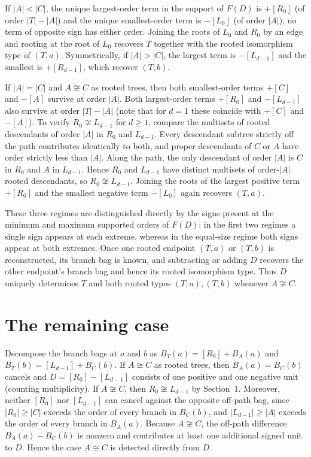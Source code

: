\documentclass[10pt]{article}
\begin{document}
If $|A|<|C|$, the unique largest-order term in the support of $F(D)$ is $+[R_0]$ (of order $|T|-|A|$) and the unique smallest-order term is $-[L_0]$ (of order $|A|$); no term of opposite sign has either order. Joining the roots of $L_0$ and $R_0$ by an edge and rooting at the root of $L_0$ recovers $T$ together with the rooted isomorphism type of $(T,a)$. Symmetrically, if $|A|>|C|$, the largest term is $-[L_{d-1}]$ and the smallest is $+[R_{d-1}]$, which recover $(T,b)$.

If $|A|=|C|$ and $A\not\cong C$ as rooted trees, then both smallest-order terms $+[C]$ and $-[A]$ survive at order $|A|$. Both largest-order terms $+[R_0]$ and $-[L_{d-1}]$ also survive at order $|T|-|A|$ (note that for $d=1$ these coincide with $+[C]$ and $-[A]$). To verify $R_0\not\cong L_{d-1}$ for $d\ge 1$, compare the multisets of rooted descendants of order $|A|$ in $R_0$ and $L_{d-1}$. Every descendant subtree strictly off the path contributes identically to both, and proper descendants of $C$ or $A$ have order strictly less than $|A|$. Along the path, the only descendant of order $|A|$ is $C$ in $R_0$ and $A$ in $L_{d-1}$. Hence $R_0$ and $L_{d-1}$ have distinct multisets of order-$|A|$ rooted descendants, so $R_0\not\cong L_{d-1}$. Joining the roots of the largest positive term $+[R_0]$ and the smallest negative term $-[L_0]$ again recovers $(T,a)$.

These three regimes are distinguished directly by the signs present at the minimum and maximum supported orders of $F(D)$: in the first two regimes a single sign appears at each extreme, whereas in the equal-size regime both signs appear at both extremes. Once one rooted endpoint $(T,a)$ or $(T,b)$ is reconstructed, its branch bag is known, and subtracting or adding $D$ recovers the other endpoint's branch bag and hence its rooted isomorphism type. Thus $D$ uniquely determines $T$ and both rooted types $(T,a),(T,b)$ whenever $A\not\cong C$.

\section{The remaining case}

Decompose the branch bags at $a$ and $b$ as $B_T(a) = [R_0] + B_A(a)$ and $B_T(b) = [L_{d-1}] + B_C(b)$. If $A\cong C$ as rooted trees, then $B_A(a)=B_C(b)$ cancels and $D = [R_0]-[L_{d-1}]$ consists of one positive and one negative unit (counting multiplicity). If $A\not\cong C$, then $R_0\not\cong L_{d-1}$ by Section~1. Moreover, neither $[R_0]$ nor $[L_{d-1}]$ can cancel against the opposite off-path bag, since $|R_0|\ge |C|$ exceeds the order of every branch in $B_C(b)$, and $|L_{d-1}|\ge |A|$ exceeds the order of every branch in $B_A(a)$. Because $A\not\cong C$, the off-path difference $B_A(a)-B_C(b)$ is nonzero and contributes at least one additional signed unit to $D$. Hence the case $A\cong C$ is detected directly from $D$.
\end{document}
